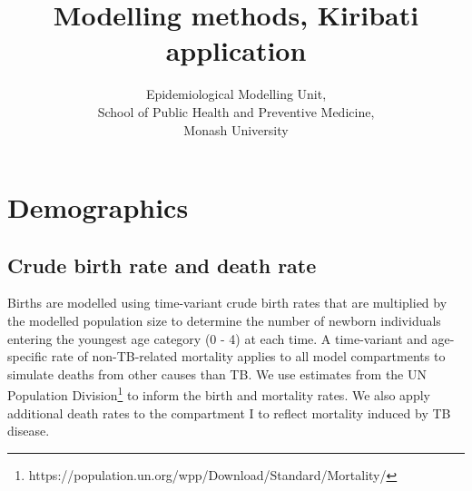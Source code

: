 \documentclass{article}
\author{
    Epidemiological Modelling Unit,
    \\ School of Public Health and Preventive Medicine,
    \\ Monash University
}
\title{Modelling methods, Kiribati application}
\begin{document}
\maketitle
\tableofcontents
\newpage


\section{Demographics}
\subsection{Crude birth rate and death rate}
Births are modelled using time-variant crude birth rates that are multiplied by the modelled population 
size to determine the number of newborn individuals entering the youngest age category (0 - 4) at each time. A time-variant 
and age-specific rate of non-TB-related mortality applies to all model compartments to simulate 
deaths from other causes than TB. We use estimates from the UN Population Division\footnote{https://population.un.org/wpp/Download/Standard/Mortality/} to inform the 
birth and mortality rates.
We also apply additional death rates to the compartment I to reflect mortality induced by TB 
disease.
\end{document}
